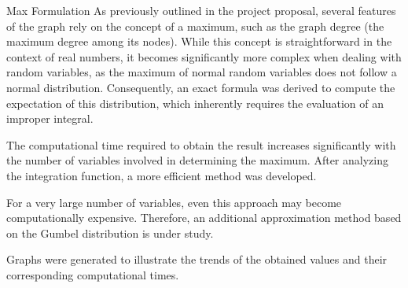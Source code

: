 \begin{projsection}{Max Formulation}
	As previously outlined in the project proposal, several features of the graph rely on the concept of a maximum, such as the graph degree (the maximum degree among its nodes).
	While this concept is straightforward in the context of real numbers, it becomes significantly more complex when dealing with random variables, as the maximum of normal random variables does not follow a normal distribution. Consequently, an exact formula was derived to compute the expectation of this distribution, which inherently requires the evaluation of an improper integral.
	
	The computational time required to obtain the result increases significantly with the number of variables involved in determining the maximum.
	After analyzing the integration function, a more efficient method was developed.
	
	For a very large number of variables, even this approach may become computationally expensive. Therefore, an additional approximation method based on the Gumbel distribution is under study.
	
	Graphs were generated to illustrate the trends of the obtained values and their corresponding computational times.
	
\end{projsection}

	
